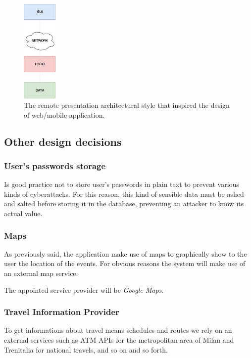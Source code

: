 \documentclass{article}
\begin{document}
	\bigskip
	\begin{figure}[!ht]
	\centering
	\includegraphics[width=0.15\textwidth]{img/diagrams/rp.png}
	\caption{The remote presentation architectural style that inspired the design of web/mobile application.}
	\end{figure}

	\newpage
	\subsection{Other design decisions}
	\subsubsection{User's passwords storage}
	Is good practice not to store user's passwords in plain text to prevent various kinds of cyberattacks. For this reason, this kind of sensible data must be ashed and salted before storing it in the database, preventing an attacker to know its actual value. 


	\subsubsection{Maps}
	As previously said, the application make use of maps to graphically show to the user the location of the events. For obvious reasons the system will make use of an external map service.

	The appointed service provider will be \textit{Google Maps}.


	\subsubsection{Travel Information Provider}
	To get informations about travel means schedules and routes we rely on an external services such as ATM APIs for the metropolitan area of Milan and Trenitalia for national travels, and so on and so forth.
\end{document}
